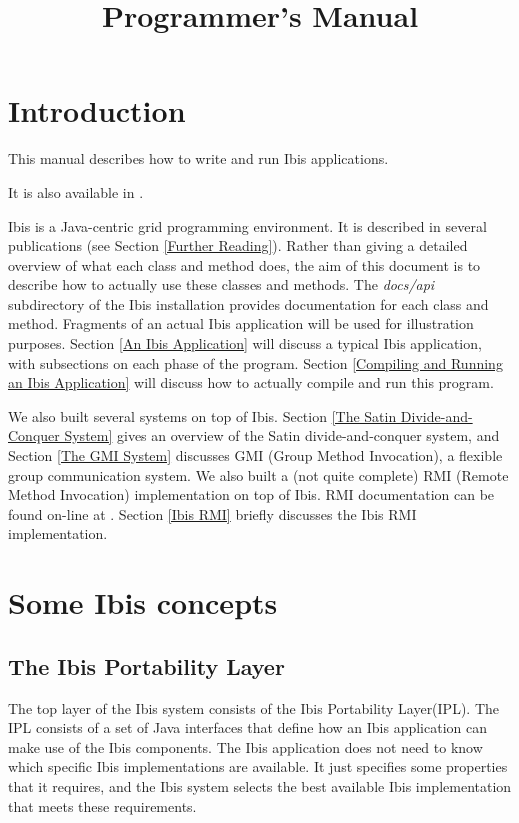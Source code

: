 \documentclass[10pt]{article}
\newcommand{\mysection}[1]{\section{#1}\label{#1}}
\newcommand{\mysubsection}[1]{\subsection{#1}\label{#1}}
\begin{document}
\title{
{}
{}
Programmer's Manual}

\maketitle

\section{Introduction}

This manual describes how to write and run Ibis applications.
\begin{htmlonly}
It is also available in
.
\end{htmlonly}
Ibis is a Java-centric grid programming environment.
It is described in several publications (see Section \ref{Further Reading}).
Rather than giving a detailed overview of what each class and method does,
the aim of this document is to describe how to actually use these classes
and methods.
The \emph{docs/api} subdirectory of the Ibis installation provides
documentation for each class and method.
Fragments of an actual Ibis application will be used for illustration purposes.
Section \ref{An Ibis Application} will discuss a typical Ibis application,
with subsections on each phase of the program.
Section \ref{Compiling and Running an Ibis Application} will discuss how to
actually compile and run this program.

We also built several systems on top of Ibis.
Section \ref{The Satin Divide-and-Conquer System}
gives an overview of the Satin divide-and-conquer
system, and Section \ref{The GMI System} discusses GMI
(Group Method Invocation),
a flexible group communication system.
We also built a (not quite complete) RMI (Remote Method Invocation)
implementation on top of Ibis. RMI documentation can be found on-line at
{}
{}.
Section \ref{Ibis RMI} briefly discusses the Ibis RMI implementation.

\mysection{Some Ibis concepts}

\mysubsection{The Ibis Portability Layer}

The top layer of the Ibis system consists of the Ibis Portability Layer(IPL).
The IPL consists of a set of Java interfaces that define how an Ibis application
can make use of the Ibis components.
The Ibis application does not need to know which specific Ibis implementations are
available.
It just specifies some properties that it requires, and the Ibis system
selects the best available Ibis implementation that meets these requirements.
 
\end{document}
